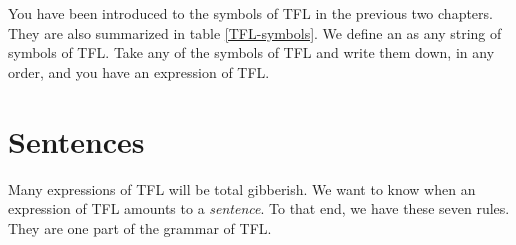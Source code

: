 You have been introduced to the symbols of TFL in the previous two chapters. They are also summarized in table \ref{TFL-symbols}. We define an  as any string of symbols of TFL. Take any of the symbols of TFL and write them down, in any order, and you have an expression of TFL.


\section{Sentences}\label{s:Sentences}
Many expressions of TFL will be total gibberish. We want to know when an expression of TFL amounts to a \emph{sentence}.
To that end, we have these seven rules. They are one part of the grammar of TFL.



